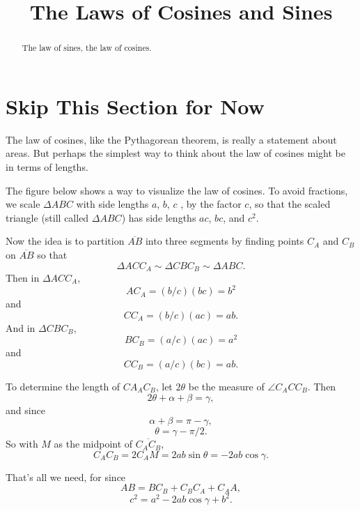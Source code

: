 \documentclass{ximera}
\title{The Laws of Cosines and Sines}
\begin{document}
\begin{abstract}
The law of sines, the law of cosines.
\end{abstract}
\maketitle

\section{Skip This Section for Now}

\begin{exploration}
The law of cosines, like the Pythagorean theorem, is really a statement about areas. But perhaps the simplest way to think about the law of cosines might be in terms of lengths. 

The figure below shows a way to visualize the law of cosines. To avoid fractions, we scale $\Delta ABC$ with side lengths $a$, $b$, $c$ , by the factor $c$, so that the scaled triangle (still called $\Delta ABC$) has side lengths $ac$, $bc$, and $c^2$.

 
\begin{onlineOnly}
    \begin{center}
\end{center}
\end{onlineOnly}


Now the idea is to partition $\overline{AB}$ into three segments by finding points $C_A$ and $C_B$ on $\overline{AB}$ so that
\[ 
    \Delta ACC_A \sim \Delta C BC_B \sim \Delta ABC .
\]
Then in $\Delta ACC_A$,
\[
    AC_A = (b/c)(bc) = b^2
\]
and
\[
  CC_A = (b/c)(ac) = ab.
\]
And in $\Delta C BC_B $,
\[
    BC_B = (a/c)(ac) = a^2
\]
and
\[
  CC_B = (a/c)(bc) = ab.
\]

To determine the length of $CA_A C_B$, let $2\theta$ be the measure of $\angle C_A C C_B$. Then
\[
     2\theta + \alpha + \beta = \gamma ,
\]
and since
\[
    \alpha + \beta = \pi - \gamma ,
\]
\[
   \theta = \gamma - \pi/2.
\]
So with $M$ as the midpoint of $\overline{C_A C_B}$,
\[
   C_A C_B = 2 C_A M = 2ab \sin \theta = -2ab\cos\gamma .
\]

That's all we need, for since
\[
    AB = BC_B + C_B C_A + C_AA ,
\]
\[
  c^2 = a^2 - 2ab \cos \gamma + b^2 .
\]


\end{exploration}
\end{document}

